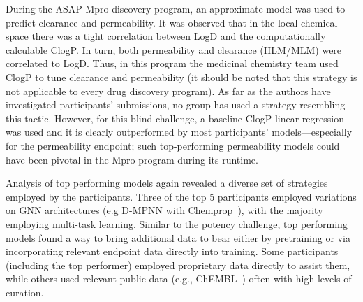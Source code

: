 \documentclass[journal=jcim,manuscript=article]{achemso}
\begin{document}
During the ASAP Mpro discovery program, an approximate model was used to predict clearance and permeability. It was observed that in the local chemical space there was a tight correlation between LogD and the computationally calculable ClogP. In turn, both permeability and clearance (HLM/MLM) were correlated to LogD. Thus, in this program the medicinal chemistry team used ClogP to tune clearance and permeability (it should be noted that this strategy is not applicable to every drug discovery program). As far as the authors have investigated participants' submissions, no group has used a strategy resembling this tactic. However, for this blind challenge, a baseline ClogP linear regression was used and it is clearly outperformed by most participants' models---especially for the permeability endpoint; such top-performing permeability models could have been pivotal in the Mpro program during its runtime. 

Analysis of top performing models again revealed a diverse set of strategies employed by the participants. Three of the top 5 participants employed variations on GNN architectures (e.g D-MPNN with Chemprop~\cite{heid2023chemprop}), with the majority employing multi-task learning. Similar to the potency challenge, top performing models found a way to bring additional data to bear either by pretraining or via incorporating relevant endpoint data directly into training. Some participants (including the top performer) employed proprietary data directly to assist them, while others used relevant public data (e.g., ChEMBL~\cite{zdrazil_2024_chembl}) often with high levels of curation.
\end{document}
